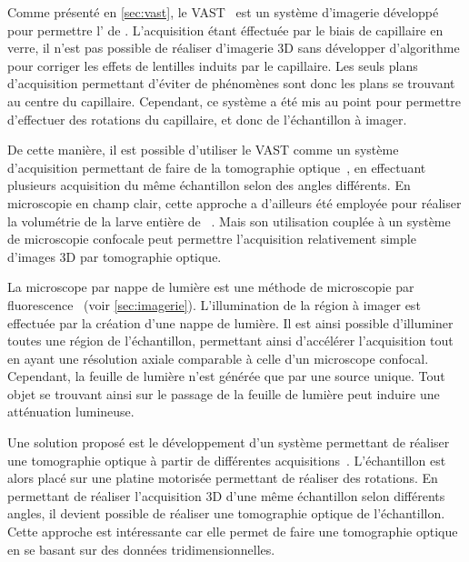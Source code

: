 \documentclass[\main/main.tex]{subfiles}
\begin{document}
%
Comme présenté en \autoref{sec:vast}, le VAST~\cite{pardomartin_2010} est un système d'imagerie développé pour permettre l'\hti{} de \pz{}.
%
L'acquisition étant éffectuée par le biais de capillaire en verre, il n'est pas possible de réaliser d'imagerie 3D sans développer d'algorithme pour corriger les effets de lentilles induits par le capillaire.
%
Les seuls plans d'acquisition permettant d'éviter de phénomènes sont donc les plans se trouvant au centre du capillaire.
%
Cependant, ce système a été mis au point pour permettre d'effectuer des rotations du capillaire, et donc de l'échantillon à imager.

%
De cette manière, il est possible d'utiliser le VAST comme un système d'acquisition permettant de faire de la tomographie optique~\cite{pardomartin_2013}, en effectuant plusieurs acquisition du même échantillon selon des angles différents.
%
En microscopie en champ clair,
cette approche a d'ailleurs été employée pour réaliser la volumétrie de la larve entière de \pz~\cite{guo_2017}.
%
Mais son utilisation couplée à un système de microscopie confocale peut permettre l'acquisition relativement simple d'images 3D par tomographie optique.

%
La microscope par nappe de lumière est une méthode de microscopie par fluorescence~\cite{voie_1993} (voir \autoref{sec:imagerie}).
%
L'illumination de la région à imager est effectuée par la création d'une nappe de lumière.
%
Il est ainsi possible d'illuminer toutes une région de l'échantillon, permettant ainsi d'accélérer l'acquisition tout en ayant une résolution axiale comparable à celle d'un microscope confocal.
%
Cependant, la feuille de lumière n'est générée que par une source unique.
%
Tout objet se trouvant ainsi sur le passage de la feuille de lumière peut induire une atténuation lumineuse.

%
Une solution proposé est le développement d'un système permettant de réaliser une tomographie optique à partir de différentes acquisitions~\cite{huisken_2004,Mayer_2018}.
%
L'échantillon est alors placé sur une platine motorisée permettant de réaliser des rotations.
%
En permettant de réaliser l'acquisition 3D d'une même échantillon selon différents angles, il devient possible de réaliser une tomographie optique de l'échantillon.
%
Cette approche est intéressante car elle permet de faire une tomographie optique en se basant sur des données tridimensionnelles.
\end{document}
